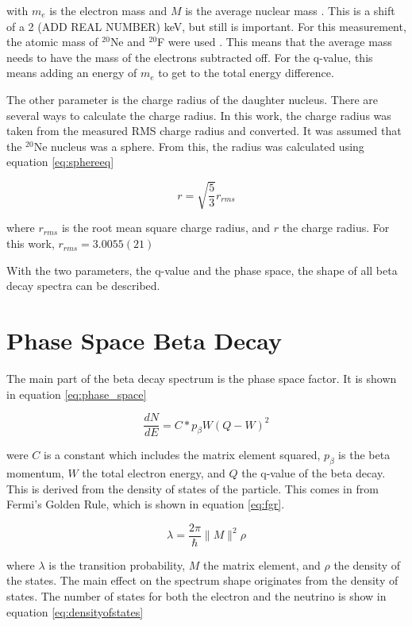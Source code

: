 \documentclass[main.tex]{subfiles}
\begin{document}
with $m_{e}$ is the electron mass and $M$ is the average nuclear mass \cite{Hol74}.
This is a shift of a 2 (ADD REAL NUMBER) keV, but still is important.
For this measurement, the atomic mass of $^{20}$Ne and $^{20}$F were used \cite{Pfe12}.
This means that the average mass needs to have the mass of the electrons subtracted off. 
For the q-value, this means adding an energy of $m_{e}$ to get to the total energy difference.

The other parameter is the charge radius of the daughter nucleus.
There are several ways to calculate the charge radius.
In this work, the charge radius was taken from the measured RMS charge radius and converted.
It was assumed that the $^{20}$Ne nucleus was a sphere. 
From this, the radius was calculated using equation \ref{eq:sphereeq}

\begin{equation}
	r = \sqrt{\frac{5}{3}}r_{rms}	
	\label{eq:sphereeq}
\end{equation}

where $r_{rms}$ is the root mean square charge radius, and $r$ the charge radius.
For this work, $r_{rms} = 3.0055 (21)$ \cite{Ang13}

With the two parameters, the q-value and the phase space, the shape of all beta decay spectra can be described.

\section{Phase Space Beta Decay}
The main part of the beta decay spectrum is the phase space factor.
It is shown in equation \ref{eq:phase_space}

\begin{equation}
	\frac{dN}{dE} = C * p_{\beta}W(Q - W)^{2}
	\label{eq:phase_space}
\end{equation}

were $C$ is a constant which includes the matrix element squared, $p_{\beta}$ is the beta momentum, $W$ the total electron energy, and $Q$ the q-value of the beta decay.
This is derived from the density of states of the particle.
This comes in from Fermi's Golden Rule, which is shown in equation \ref{eq:fgr}.

\begin{equation}
	\lambda = \frac{2\pi}{\hbar}\|M\|^{2}\rho
	\label{eq:fgr}
\end{equation}

where $\lambda$ is the transition probability, $M$ the matrix element, and $\rho$ the density of the states.
The main effect on the spectrum shape originates from the density of states.
The number of states for both the electron and the neutrino is show in equation \ref{eq:densityofstates}
\end{document}
